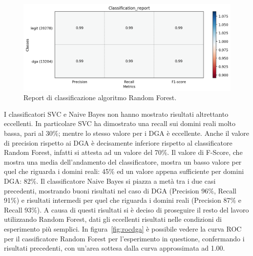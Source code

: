 \begin{figure}[!bp]
    \centering
    \includegraphics[width=\columnwidth]{figures/rndf_tra_nosup_nosup/class_rep.png}
    \caption{Report di classificazione algoritmo Random Forest.\label{fig:repdga}}
\end{figure}

I classificatori SVC e Naive Bayes non hanno mostrato risultati altrettanto eccellenti. In particolare SVC ha dimostrato una recall sui domini reali molto bassa, pari al 30\%; mentre lo stesso valore per i DGA è eccellente. Anche il valore di precision rispetto ai DGA è decisamente inferiore rispetto al classificatore Random Forest, infatti si attesta ad un valore del 70\%. Il valore di F-Score, che mostra una media dell'andamento del classificatore, mostra un basso valore per quel che riguarda i domini reali: 45\% ed un valore appena sufficiente per domini DGA: 82\%.
Il classificatore Naive Bayes si piazza a metà tra i due casi precedenti, mostrando buoni risultati nel caso di DGA (Precision 96\%, Recall 91\%) e risultati intermedi per quel che riguarda i domini reali (Precision 87\% e Recall 93\%). A causa di questi risultati si è deciso di proseguire il resto del lavoro utilizzando Random Forest, dati gli eccellenti risultati nelle condizioni di esperimento più semplici. 
In figura~\ref{fig:rocdga} è possibile vedere la curva ROC per il cassificatore Random Forest per l'esperimento in questione, confermando i risultati precedenti, con un'area sottesa dalla curva approssimata ad 1.00.


